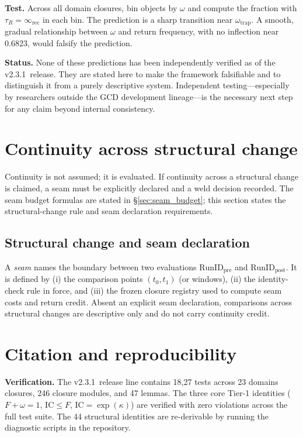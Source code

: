 \documentclass[
  aps,
  prd,
  preprint,
  superscriptaddress,
  nofootinbib,
  floatfix
]{revtex4-2}
\newcommand{\Rinf}{\infty_{\mathrm{rec}}}
\newcommand{\IC}{\mathrm{IC}}
\newcommand{\ValidatorLine}{v2.3.1}
\begin{document}
\textbf{Test.} Across all domain closures, bin objects by $\omega$ and compute the fraction with $\tau_R = \Rinf$
in each bin. The prediction is a sharp transition near $\omega_{\mathrm{trap}}$.
A smooth, gradual relationship between $\omega$ and return frequency, with no inflection near 0.6823,
would falsify the prediction.

\medskip
\noindent\textbf{Status.}
None of these predictions has been independently verified as of the \ValidatorLine\ release.
They are stated here to make the framework falsifiable and to distinguish it from a purely descriptive system.
Independent testing---especially by researchers outside the GCD development lineage---is the necessary
next step for any claim beyond internal consistency.

\section{Continuity across structural change}
\label{sec:continuity}

Continuity is not assumed; it is evaluated. If continuity across a structural change is claimed, a seam must be
explicitly declared and a weld decision recorded. The seam budget formulas are stated in \S\ref{sec:seam_budget};
this section states the structural-change rule and seam declaration requirements.

\subsection{Structural change and seam declaration}
A \emph{seam} names the boundary between two evaluations $\mathrm{RunID}_{\mathrm{pre}}$ and $\mathrm{RunID}_{\mathrm{post}}$.
It is defined by (i) the comparison points $(t_0,t_1)$ (or windows), (ii) the identity-check rule in force,
and (iii) the frozen closure registry used to compute seam costs and return credit.
Absent an explicit seam declaration, comparisons across structural changes are descriptive only and do not carry continuity credit.
\section{Citation and reproducibility}
\label{sec:citation_repro}

\noindent\textbf{Verification.}
The \ValidatorLine\ release line contains 18{,}27 tests across 23 domains closures, 246 closure modules,
and 47 lemmas. The three core Tier-1 identities ($F+\omega=1$, $\IC\le F$, $\IC=\exp(\kappa)$) are verified with
zero violations across the full test suite. The 44 structural identities are re-derivable by running the diagnostic
scripts in the repository.
\end{document}
